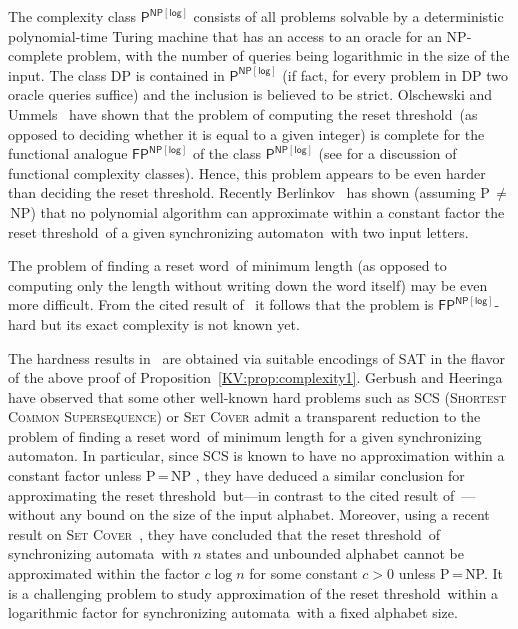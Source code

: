 \documentclass{irmaart}
\newcommand{\sa}{synchronizing au\-tom\-a\-ta}
\newcommand{\san}{synchronizing au\-tom\-a\-ton}
\newcommand{\sw}{reset word}
\newcommand{\rt}{reset threshold}
\theoremstyle{plain}
\begin{document}
The complexity class $\mathsf{P}^\mathsf{NP[log]}$ consists of all problems
solvable by a deterministic polynomial-time Turing machine that has an access
to an oracle for an \textsf{NP}-complete problem, with the number of queries
being logarithmic in the size of the input. The class \textsf{DP} is contained
in $\mathsf{P}^\mathsf{NP[log]}$ (if fact, for every problem in \textsf{DP} two
oracle queries suffice) and the inclusion is believed to be strict. Olschewski
and Ummels~\cite{Olschewski&Ummels:2010} have shown that the problem of
computing the \rt\ (as opposed to deciding whether it is equal to a given
integer) is complete for the functional analogue $\mathsf{FP}^\mathsf{NP[log]}$
of the class $\mathsf{P}^\mathsf{NP[log]}$ (see \cite{Selman:1994} for a
discussion of functional complexity classes). Hence, this problem appears to be
even harder than deciding the \rt. Recently Berlinkov~\cite{Berlinkov:2010} has
shown (assuming \textsf{P}\,$\ne$\,\textsf{NP}) that no polynomial algorithm
can approximate within a constant factor the \rt\ of a given \san\ with two
input letters.

The problem of finding a \sw\ of minimum length (as opposed to computing only
the length without writing down the word itself) may be even more difficult.
From the cited result of~\cite{Olschewski&Ummels:2010} it follows that the
problem is $\mathsf{FP}^\mathsf{NP[log]}$-hard but its exact complexity is not
known yet.

The hardness results
in~\cite{Berlinkov:2010,Olschewski&Ummels:2010} are obtained via
suitable encodings of \textsc{SAT} in the flavor of the above
proof of Proposition~\ref{KV:prop:complexity1}. Gerbush and
Heeringa~\cite{Gerbush&Heeringa:2011} have observed that some
other well-known hard problems such as \textsc{SCS}
(\textsc{Shortest Common Supersequence}) or \textsc{Set Cover}
admit a transparent reduction to the problem of finding a \sw\ of
minimum length for a given \san. In particular, since \textsc{SCS}
is known to have no approximation within a constant factor unless
\textsf{P}\,=\,\textsf{NP} \cite{Jiang&Li:1995}, they have deduced
a similar conclusion for approximating the \rt\ but---in contrast
to the cited result of~\cite{Berlinkov:2010}---without any bound
on the size of the input alphabet. Moreover, using a recent result
on \textsc{Set Cover}~\cite{Alon&Moshkovitz&Safra:2006}, they have
concluded that the \rt\ of \sa\ with $n$ states and unbounded
alphabet cannot be approximated within the factor $c\log n$ for
some constant $c>0$ unless \textsf{P}\,=\,\textsf{NP}. It is a
challenging problem to study approximation of the \rt\ within a
logarithmic factor for \sa\ with a fixed alphabet size.
\end{document}
